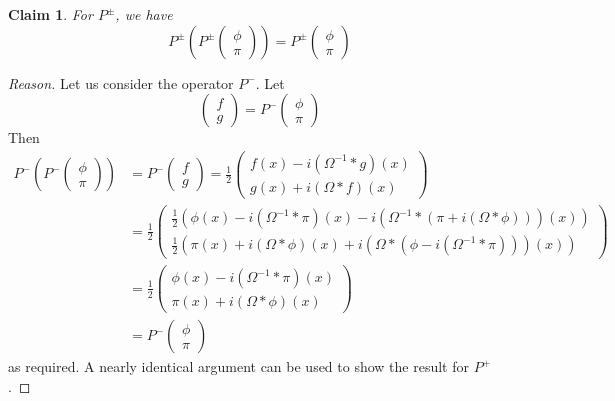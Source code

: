 \documentclass[12pt,oneside]{article}
\newtheorem{claim}{Claim}
\begin{document}
\begin{claim}
  For $P^{\pm}$, we have 
  \begin{equation}
    P^{\pm}\left(P^{\pm}\begin{pmatrix}\phi \\ \pi\end{pmatrix}\right)=P^{\pm}\begin{pmatrix}\phi \\ \pi\end{pmatrix}
  \end{equation}
\end{claim}
\begin{proof}[Reason]
  Let us consider the operator $P^{-}$. Let \begin{equation}
\begin{pmatrix}f\\ g\end{pmatrix}=P^{-}\begin{pmatrix}\phi\\ \pi\end{pmatrix}
\end{equation}
Then \begin{align*}
P^{-}\left(P^{-}\begin{pmatrix}\phi \\ \pi\end{pmatrix}\right)&=P^{-}\begin{pmatrix}f\\ g\end{pmatrix}=\frac{1}{2}\begin{pmatrix}f(x)-i(\Omega^{-1}*g)(x)\\ g(x)+i(\Omega*f)(x)\end{pmatrix}\\
&=\frac{1}{2}\begin{pmatrix}\frac{1}{2}(\phi(x)-i(\Omega^{-1}*\pi)(x)-i(\Omega^{-1}*(\pi+i(\Omega*\phi)))(x))\\
  \frac{1}{2}(\pi(x)+i(\Omega*\phi)(x)+i(\Omega*(\phi-i(\Omega^{-1}*\pi)))(x))\end{pmatrix}\\
&=\frac{1}{2}\begin{pmatrix}\phi(x)-i(\Omega^{-1}*\pi)(x)\\
  \pi(x)+i(\Omega*\phi)(x)\end{pmatrix}\\
&=P^{-}\begin{pmatrix}\phi\\ \pi\end{pmatrix}
\end{align*}
as required. A nearly identical argument can be used to show the
result for $P^{+}$.
\end{proof}
\end{document}
